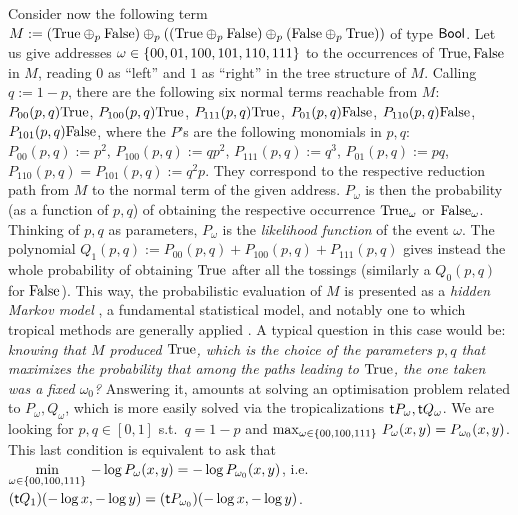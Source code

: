 \documentclass[submission,%
]{eptcs}
\begin{document}
Consider now the following term
$
 M:=(\mathrm{True} \oplus_p\mathrm{False})\oplus_p((\mathrm{True}\oplus_p\mathrm{False})\oplus_p(\mathrm{False}\oplus_p\mathrm{True}))
$
of type $\mathsf{Bool}$.
Let us give addresses $\omega\in\{00,01,100,101,110,111\}$ to the occurrences of $\mathrm{True},\mathrm{False}$ in $M$, reading $0$ as ``left'' and $1$ as ``right'' in the tree structure of $M$.
Calling $q:=1-p$, there are the following six normal terms reachable from $M$:
$P_{00}(p,q)\mathrm{True}$, 
$P_{100}(p,q)\mathrm{True}$, 
$P_{111}(p,q)\mathrm{True}$, 
$P_{01}(p,q)\mathrm{False}$, 
$P_{110}(p,q)\mathrm{False}$,
$P_{101}(p,q)\mathrm{False}$,
where the $P$'s are the following monomials in $p,q$:
$P_{00}(p,q):=p^2$,
$P_{100}(p,q):=qp^2$,
$P_{111}(p,q):=q^3$,
$P_{01}(p,q):=pq$,
$P_{110}(p,q)=P_{101}(p,q):=q^2p$.
They correspond to the respective reduction path from $M$ to the normal term of the given address.
$P_{\omega}$ is then the probability (as a function of $p,q$) of obtaining the respective occurrence $\mathrm{True}_{\omega}$ or $\mathrm{False}_\omega$.%
Thinking of $p,q$ as parameters, $P_{\omega}$ is the \emph{likelihood function} of the event $\omega$.
The polynomial $Q_{1}(p,q):=P_{00}(p,q)+P_{100}(p,q)+P_{111}(p,q)$ gives instead the whole probability of obtaining $\mathrm{True}$ after all the tossings (similarly a $Q_{0}(p,q)$ for $\mathrm{False}$).
This way, the probabilistic evaluation of $M$ is presented as a \emph{hidden Markov model} \cite{Baum1966}, a fundamental statistical model, and notably one to which tropical methods are generally applied \cite{Pachter2004}.
A typical question in this case would be: \emph{knowing that $M$ produced $\mathrm{True}$, which is the choice of the parameters $p,q$ that maximizes the probability that %
among the paths leading to $\mathrm{True}$, the one taken was a fixed $\omega_0$?}
Answering it, amounts at solving an optimisation problem related to $P_{\omega}, Q_\omega$, which is more easily solved via the tropicalizations $\mathsf{t} P_{\omega},\mathsf{t} Q_{\omega}$. 
We are looking for $p,q\in[0,1]$ s.t.\ $q=1-p$ and
$\max_{\omega\in\{00,100,111\}} \, P_\omega(x,y) = P_{\omega_0}(x,y)$.
This last condition is equivalent to ask that
$\min\limits_{\omega\in\{00,100,111\}} \, -\log P_\omega(x,y) = -\log P_{\omega_0}(x,y)$,
i.e.\
$(\mathsf{t} Q_1)( -\log x, -\log y) = (\mathsf{t} P_{\omega_0})( -\log x, -\log y)$.
\end{document}
